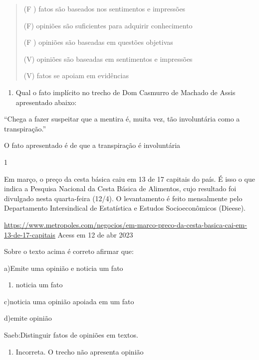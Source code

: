 {\begin{quote}
(F ) fatos são baseados nos sentimentos e impressões

(F) opiniões são suficientes para adquirir conhecimento

(F ) opiniões são baseadas em questões objetivas

(V) opiniões são baseadas em sentimentos e impressões

(V) fatos se apoiam em evidências
\end{quote}

\begin{enumerate}
\def\labelenumi{\arabic{enumi})}
\setcounter{enumi}{9}
\tightlist
\item
  Qual o fato implícito no trecho de Dom Casmurro de Machado de Assis
  apresentado abaixo:
\end{enumerate}

``Chega a fazer suspeitar que a mentira é, muita vez, tão involuntária
como a transpiração.''

O fato apresentado é de que a transpiração é involuntária


\num{1}

Em março, o preço da cesta básica caiu em 13 de 17 capitais do país. É
isso o que indica a Pesquisa Nacional da Cesta Básica de Alimentos, cujo
resultado foi divulgado nesta quarta-feira (12/4). O levantamento é
feito mensalmente pelo Departamento Intersindical de Estatística e
Estudos Socioeconômicos (Dieese).

\href{https://www.metropoles.com/negocios/em-marco-preco-da-cesta-basica-cai-em-13-de-17-capitais}{\uline{https://www.metropoles.com/negocios/em-marco-preco-da-cesta-basica-cai-em-13-de-17-capitais}}
Acess em 12 de abr 2023

Sobre o texto acima é correto afirmar que:

a)Emite uma opinião e noticia um fato

\begin{enumerate}
\def\labelenumi{\arabic{enumi}.}
\tightlist
\item
  noticia um fato
\end{enumerate}

c)noticia uma opinião apoiada em um fato

d)emite opinião

Saeb:Distinguir fatos de opiniões em textos.

\begin{enumerate}
\def\labelenumi{\arabic{enumi}.}
\tightlist
\item
  Incorreta. O trecho não apresenta opinião
\end{enumerate}

}
